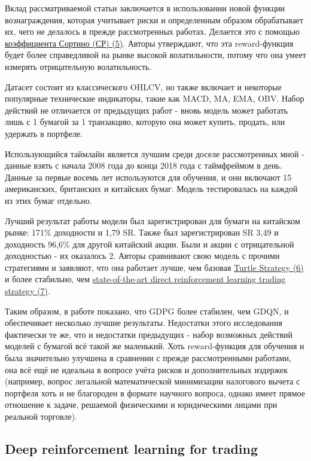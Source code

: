 \documentclass[a4paper,14pt]{extarticle}
\newcommand{\bibref}[3]{\hyperlink{#1}{#2 (#3)}} %
\begin{document}
Вклад рассматриваемой статьи заключается в использовании новой функции вознаграждения, которая учитывает риски и определенным образом обрабатывает их, чего не делалось в прежде рассмотренных работах. Делается это с помощью \bibref{5}{коэффициента Сортино (СР)}{5}. Авторы утверждают, что эта reward-функция будет более справедливой на рынке высокой волатильности, потому что она умеет измерять отрицательную волатильность. 

Датасет состоит из классического OHLCV, но также включает и некоторые популярные технические индикаторы, такие как MACD, MA, EMA, OBV. Набор действий не отличается от предыдущих работ - вновь модель может работать лишь с 1 бумагой за 1 транзакцию, которую она может купить, продать, или удержать в портфеле.

Использующийся таймлайн является лучшим среди доселе рассмотренных мной - данные взять с начала 2008 года до конца 2018 года с таймфреймом в день. Данные за первые восемь лет используются для обучения, и они включают 15 американских, британских и китайских бумаг. Модель тестировалась на каждой из этих бумаг отдельно.

Лучший результат работы модели был зарегистрирован для бумаги на китайском рынке: 171\% доходности и 1,79 SR. Также был зарегистрирован SR 3,49 и доходность 96,6\% для другой китайский акции. Были и акции с отрицательной доходностью - их оказалось 2. Авторы сравнивают свою модель с прочими стратегиями и заявляют, что она работает лучше, чем базовая \bibref{6}{Turtle Strategy}{6} и более стабильно, чем \bibref{7}{state-of-the-art direct reinforcement learning trading strategy}{7}. 

Таким образом, в работе показано, что GDPG более стабилен, чем GDQN, и обеспечивает несколько лучшие результаты. Недостатки этого исследования фактически те же, что и недостатки предыдущих - набор возможных действий моделей с бумагой всё такой же маленький. Хоть reward-функция для обучения и была значительно улучшена в сравнении с прежде рассмотренными работами, она всё ещё не идеальна в вопросе учёта рисков и дополнительных издержек (например, вопрос легальной математической минимизации налогового вычета с портфеля хоть и не благороден в формате научного вопроса, однако имеет прямое отношение к задаче, решаемой физическими и юридическими лицами при реальной торговле).

\subsection{Deep reinforcement learning for trading}
\end{document}
